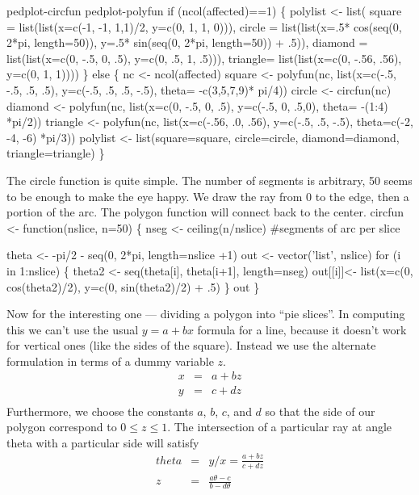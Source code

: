 \documentclass{article}
\begin{document}
\begin{enumerate}
\nwenddocs{}\endmoddef
\LA{}pedplot-circfun\RA{}
\LA{}pedplot-polyfun\RA{}
if (ncol(affected)==1) \{
    polylist <- list(
        square = list(list(x=c(-1, -1, 1,1)/2,  y=c(0, 1, 1, 0))),
        circle = list(list(x=.5* cos(seq(0, 2*pi, length=50)),
                           y=.5* sin(seq(0, 2*pi, length=50)) + .5)),
        diamond = list(list(x=c(0, -.5, 0, .5), y=c(0, .5, 1, .5))),
        triangle= list(list(x=c(0, -.56, .56),  y=c(0, 1, 1))))
    \}
else \{
    nc <- ncol(affected)
    square <- polyfun(nc, list(x=c(-.5, -.5, .5, .5), y=c(-.5, .5, .5, -.5),
                                theta= -c(3,5,7,9)* pi/4))
    circle <- circfun(nc)
    diamond <-  polyfun(nc, list(x=c(0, -.5, 0, .5), y=c(-.5, 0, .5,0),
                                theta= -(1:4) *pi/2))
    triangle <- polyfun(nc, list(x=c(-.56, .0, .56), y=c(-.5, .5, -.5),
                                 theta=c(-2, -4, -6) *pi/3))
    polylist <- list(square=square, circle=circle, diamond=diamond, 
                     triangle=triangle)
    \}
\nwendcode{}\nwdocspar

The circle function is quite simple.  The number of segments is arbitrary,
50 seems to be enough to make the eye happy.  We draw the ray from 0 to
the edge, then a portion of the arc.  The polygon function will connect
back to the center.
\nwenddocs{}\endmoddef
circfun <- function(nslice, n=50) \{
    nseg <- ceiling(n/nslice)  #segments of arc per slice
    
    theta <- -pi/2 - seq(0, 2*pi, length=nslice +1)
    out <- vector('list', nslice)
    for (i in 1:nslice) \{
        theta2 <- seq(theta[i], theta[i+1], length=nseg)
        out[[i]]<- list(x=c(0, cos(theta2)/2),
                        y=c(0, sin(theta2)/2) + .5)
        \}
    out
    \}
\nwendcode{}\nwdocspar

Now for the interesting one --- dividing a polygon into ``pie slices''.
In computing this we can't use the usual $y= a + bx$ formula for a line,
because it doesn't work for vertical ones (like the sides of the square).
Instead we use the alternate formulation in terms of a dummy variable 
$z$.
\begin{eqnarray*}
  x &=& a + bz \\
  y &=& c + dz \\
\end{eqnarray*}
Furthermore, we choose the constants $a$, $b$, $c$, and $d$ so that 
the side of our polygon correspond to $0 \le z \le 1$.
The intersection of a particular ray at angle theta with a 
particular side will satisfy
\begin{eqnarray}
  theta &=& y/x = \frac{a + bz}{c+dz} \nonumber \\
  z &=& \frac{a\theta -c}{b - d\theta} \label{eq:z} \\
\end{eqnarray}


\end{enumerate}
\end{document}
